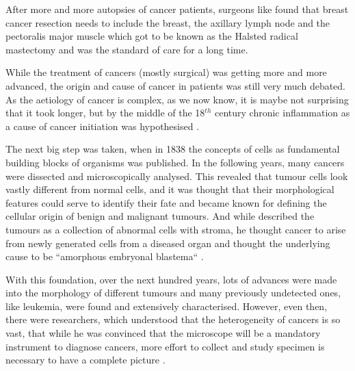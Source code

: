 After more and more autopsies of cancer patients, surgeons like \textcite{Heister1747} found that breast cancer resection needs to include the breast, the axillary lymph node and the pectoralis major muscle which got to be known as the Halsted radical mastectomy and was the standard of care for a long time.

While the treatment of cancers (mostly surgical) was getting more and more advanced, the origin and cause of cancer in patients was still very much debated. As the aetiology of cancer is complex, as we now know, it is maybe not surprising that it took longer, but by  the middle of the 18$^{th}$ century chronic inflammation as a cause of cancer initiation was hypothesised \cite{Hajdu2010b}.

The next big step was taken, when in 1838 the concepts of cells as fundamental building blocks of organisms was published. In the following years, many cancers were dissected and microscopically analysed. This revealed that tumour cells look vastly different from normal cells, and it was thought that their morphological features could serve to identify their fate and became known for defining the cellular origin of benign and malignant tumours. And while \citeauthor{Mueller1838} described the tumours as a collection of abnormal cells with stroma, he thought cancer to arise from newly generated cells from a diseased organ and thought the underlying cause to be ``amorphous embryonal blastema`` \cite{Mueller1838}.

With this foundation, over the next hundred years, lots of advances were made into the morphology of different tumours and many previously undetected ones, like leukemia, were found and extensively characterised. However, even then, there were researchers, which understood that the heterogeneity of cancers is so vast, that while he was convinced that the microscope will be a mandatory instrument to diagnose cancers, more effort to collect and study specimen is necessary to have a complete picture \cite{Bennett1849}.


